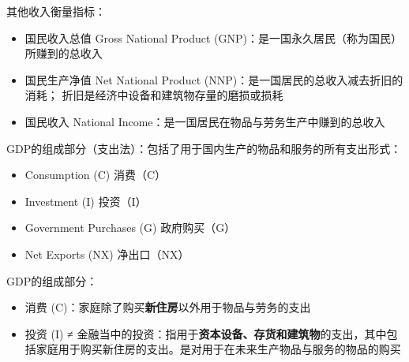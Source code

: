 其他收入衡量指标：
\begin{itemize}
  \item 国民收入总值 Gross National Product (GNP)：是一国永久居民（称为国民）所赚到的总收入 
  \item 国民生产净值 Net National Product (NNP)：是一国居民的总收入减去折旧的消耗； 折旧是经济中设备和建筑物存量的磨损或损耗
  \item 国民收入 National Income：是一国居民在物品与劳务生产中赚到的总收入
\end{itemize}

GDP的组成部分（支出法）：包括了用于国内生产的物品和服务的所有支出形式：
\begin{itemize}
  \item Consumption (C) 消费（C）
  \item Investment (I) 投资（I）
  \item Government Purchases (G) 政府购买（G）
  \item Net Exports (NX) 净出口（NX）
\end{itemize}

GDP的组成部分：
\begin{itemize}
  \item 消费 (C)：家庭除了购买\textbf{新住房}以外用于物品与劳务的支出
  \item 投资 (I) ≠ 金融当中的投资：指用于\textbf{资本设备、存货和建筑物}的支出，其中包括家庭用于购买新住房的支出。是对用于在未来生产物品与服务的物品的购买
\end{itemize}